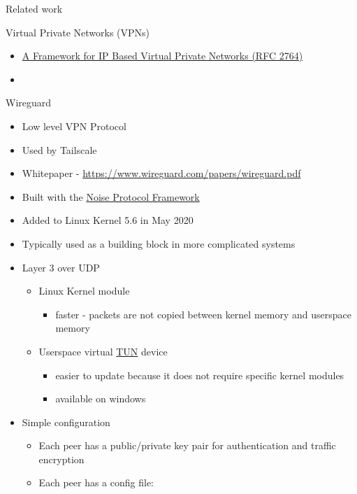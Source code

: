 \begin{frame}[fragile]{Related work}
\begin{block}{Virtual Private Networks (VPNs)}
\begin{itemize}
  \begin{itemize}
  \tightlist
  \item
    \href{https://www.rfc-editor.org/rfc/rfc2764.html}{A Framework for
    IP Based Virtual Private Networks (RFC 2764)}
  \item
  \end{itemize}
\end{itemize}
\end{block}

\begin{block}{Wireguard}
\protect\hypertarget{wireguard}{}
\begin{itemize}
\tightlist
\item
  Low level VPN Protocol
\item
  Used by Tailscale
\item
  Whitepaper - \url{https://www.wireguard.com/papers/wireguard.pdf}
\item
  Built with the \href{notes/02022-noise.md}{Noise Protocol Framework}
\item
  Added to Linux Kernel 5.6 in May 2020
\item
  Typically used as a building block in more complicated systems
\item
  Layer 3 over UDP

  \begin{itemize}
  \tightlist
  \item
    Linux Kernel module

    \begin{itemize}
    \tightlist
    \item
      faster - packets are not copied between kernel memory and
      userspace memory
    \end{itemize}
  \item
    Userspace virtual \href{notes/02021-internet-protocol}{TUN} device

    \begin{itemize}
    \tightlist
    \item
      easier to update because it does not require specific kernel
      modules
    \item
      available on windows
    \end{itemize}
  \end{itemize}
\item
  Simple configuration

  \begin{itemize}
  \tightlist
  \item
    Each peer has a public/private key pair for authentication and
    traffic encryption
  \item
    Each peer has a config file:
  \end{itemize}
\end{itemize}


\end{block}
\end{frame}
